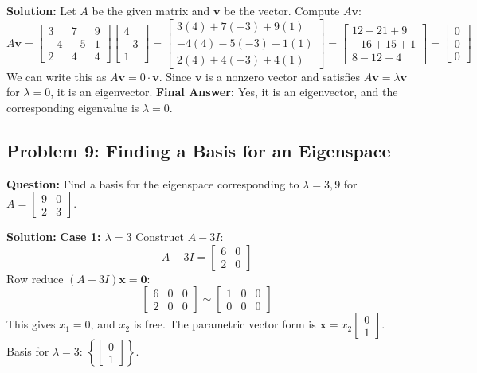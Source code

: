 \documentclass[11pt, a4paper]{article}
\theoremstyle{definition}
\theoremstyle{remark}
\begin{document}
\textbf{Solution:}
Let $A$ be the given matrix and $\mathbf{v}$ be the vector. Compute $A\mathbf{v}$:
\[
A\mathbf{v} = \begin{bmatrix} 3 & 7 & 9 \\ -4 & -5 & 1 \\ 2 & 4 & 4 \end{bmatrix} \begin{bmatrix} 4 \\ -3 \\ 1 \end{bmatrix} = \begin{bmatrix} 3(4) + 7(-3) + 9(1) \\ -4(4) - 5(-3) + 1(1) \\ 2(4) + 4(-3) + 4(1) \end{bmatrix} = \begin{bmatrix} 12 - 21 + 9 \\ -16 + 15 + 1 \\ 8 - 12 + 4 \end{bmatrix} = \begin{bmatrix} 0 \\ 0 \\ 0 \end{bmatrix}
\]
We can write this as $A\mathbf{v} = 0 \cdot \mathbf{v}$. Since $\mathbf{v}$ is a nonzero vector and satisfies $A\mathbf{v} = \lambda \mathbf{v}$ for $\lambda = 0$, it is an eigenvector.
\textbf{Final Answer:} Yes, it is an eigenvector, and the corresponding eigenvalue is $\lambda = 0$.

\subsection{Problem 9: Finding a Basis for an Eigenspace}
\textbf{Question:} Find a basis for the eigenspace corresponding to $\lambda = 3, 9$ for $A = \begin{bmatrix} 9 & 0 \\ 2 & 3 \end{bmatrix}$.

\textbf{Solution:}
\textbf{Case 1: $\lambda = 3$}
Construct $A - 3I$:
\[
A - 3I = \begin{bmatrix} 6 & 0 \\ 2 & 0 \end{bmatrix}
\]
Row reduce $(A - 3I)\mathbf{x} = \mathbf{0}$:
\[
\begin{bmatrix} 6 & 0 & 0 \\ 2 & 0 & 0 \end{bmatrix} \sim \begin{bmatrix} 1 & 0 & 0 \\ 0 & 0 & 0 \end{bmatrix}
\]
This gives $x_1 = 0$, and $x_2$ is free. The parametric vector form is $\mathbf{x} = x_2 \begin{bmatrix} 0 \\ 1 \end{bmatrix}$.
Basis for $\lambda = 3$: $\left\{ \begin{bmatrix} 0 \\ 1 \end{bmatrix} \right\}$.
\end{document}
